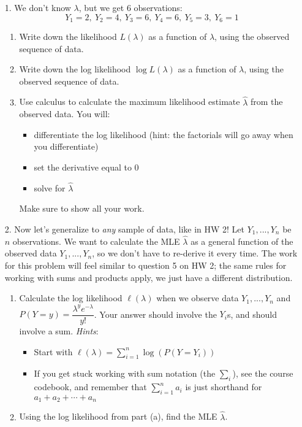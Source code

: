 \documentclass[11pt]{article}
\begin{document}
\begin{enumerate}
\item[1.] We don't know $\lambda$, but we get 6 observations:
$$Y_1 = 2, \ Y_2 = 4, \ Y_3 = 6, \ Y_4 = 6, \ Y_5 = 3, \ Y_6 = 1$$

\begin{enumerate}

\item Write down the likelihood $L(\lambda)$ as a function of $\lambda$, using the observed sequence of data.

\item Write down the log likelihood $\log L(\lambda)$ as a function of $\lambda$, using the observed sequence of data.

\item Use calculus to calculate the maximum likelihood estimate $\widehat{\lambda}$ from the observed data. You will:
\begin{itemize}
\item differentiate the log likelihood (hint: the factorials will go away when you differentiate)
\item set the derivative equal to 0
\item solve for $\widehat{\lambda}$
\end{itemize}
Make sure to show all your work.
\end{enumerate}

\item[2.] Now let's generalize to \textit{any} sample of data, like in HW 2! Let $Y_1,...,Y_n$ be $n$ observations. We want to calculate the MLE $\widehat{\lambda}$ as a general function of the observed data $Y_1,...,Y_n$, so we don't have to re-derive it every time. The work for this problem will feel similar to question 5 on HW 2; the same rules for working with sums and products apply, we just have a different distribution.

\begin{enumerate}
\item Calculate the log likelihood $\ell(\lambda)$ when we observe data $Y_1,...,Y_n$ and $P(Y = y) = \dfrac{\lambda^y e^{-\lambda}}{y!}$. Your answer should involve the $Y_i$s, and should involve a sum. \textit{Hints}:

\begin{itemize}
\item Start with $\ell(\lambda) = \sum \limits_{i=1}^n \log(P(Y = Y_i))$
\item If you get stuck working with sum notation (the $\sum_i$), see the course codebook, and remember that $\sum \limits_{i=1}^n a_i$ is just shorthand for $a_1 + a_2 + \cdots + a_n$
\end{itemize}

\item Using the log likelihood from part (a), find the MLE $\widehat{\lambda}$.
\end{enumerate}
\end{enumerate}
\end{document}
